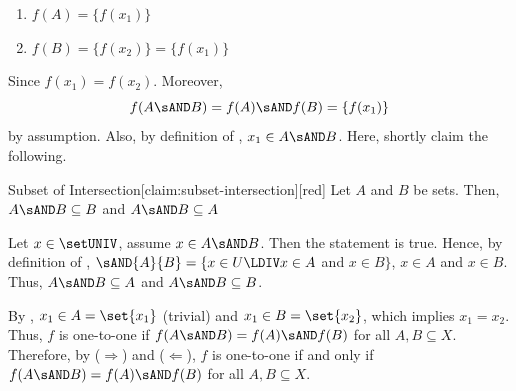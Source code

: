 \begin{enumerate}
\begin{enumerate}
\begin{subprove}
      \begin{enumerate}
        \item $f(A) = \{f(x_1)\}$
        \item $f(B) = \{f(x_2)\} = \{f(x_1)\}$
      \end{enumerate}
      Since $f(x_1) = f(x_2)$. Moreover,
      $$f(A \sAND B) = f(A) \sAND f(B) = \{f(x_1)\}$$ by assumption. 
      Also, by definition of , $x_1 \in A \sAND B$.
      Here, shortly claim the following.
      \begin{define}{Subset of Intersection}[claim:subset-intersection][red]
        Let $A$ and $B$ be sets. Then, $A \sAND B \subseteq B$ and $A \sAND B \subseteq A$
        \begin{subprove}[red]
          Let $x\in \setUNIV$, assume $x\in A \sAND B$. Then the statement  is true.
          Hence, by definition of , $\sAND{A}{B}=\{x\in U\LDIV x\in A$ and $x\in B\}$, $x\in A$ and $x\in B$.
          Thus, $A \sAND B \subseteq A$ and $A \sAND B \subseteq B$.
        \end{subprove}
      \end{define}
      By , $x_1 \in A=\set{x_1}$ (trivial) 
      and $x_1 \in B=\set{x_2}$, which implies $x_1 = x_2$.\proofstep
      Thus, $f$ is one-to-one if $f(A \sAND B)=f(A) \sAND f(B)$ for all $A, B \subseteq X$.\proofstep
      Therefore, by ($\Rightarrow$) and ($\Leftarrow$), $f$ is one-to-one 
      if and only if $f(A \sAND B)=f(A) \sAND f(B)$ for all $A, B \subseteq X$.
    \end{subprove}
  \end{enumerate}
\end{enumerate}
